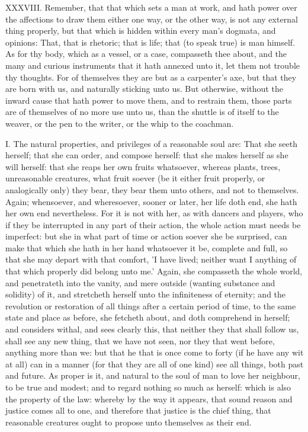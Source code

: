 XXXVIII. Remember, that that which sets a man at work, and hath power
over the affections to draw them either one way, or the other way, is not
any external thing properly, but that which is hidden within every man's
dogmata, and opinions: That, that is rhetoric; that is life; that (to
speak true) is man himself. As for thy body, which as a vessel, or a case,
compasseth thee about, and the many and curious instruments that it hath
annexed unto it, let them not trouble thy thoughts. For of themselves they
are but as a carpenter's axe, but that they are born with us, and
naturally sticking unto us. But otherwise, without the inward cause that
hath power to move them, and to restrain them, those parts are of
themselves of no more use unto us, than the shuttle is of itself to the
weaver, or the pen to the writer, or the whip to the coachman.


I. The natural properties, and privileges of a reasonable soul are: That
she seeth herself; that she can order, and compose herself: that she makes
herself as she will herself: that she reaps her own fruits whatsoever,
whereas plants, trees, unreasonable creatures, what fruit soever (be it
either fruit properly, or analogically only) they bear, they bear them
unto others, and not to themselves. Again; whensoever, and wheresoever,
sooner or later, her life doth end, she hath her own end nevertheless. For
it is not with her, as with dancers and players, who if they be
interrupted in any part of their action, the whole action must needs be
imperfect: but she in what part of time or action soever she be surprised,
can make that which she hath in her hand whatsoever it be, complete and
full, so that she may depart with that comfort, 'I have lived; neither
want I anything of that which properly did belong unto me.' Again, she
compasseth the whole world, and penetrateth into the vanity, and mere
outside (wanting substance and solidity) of it, and stretcheth herself
unto the infiniteness of eternity; and the revolution or restoration of
all things after a certain period of time, to the same state and place as
before, she fetcheth about, and doth comprehend in herself; and considers
withal, and sees clearly this, that neither they that shall follow us,
shall see any new thing, that we have not seen, nor they that went before,
anything more than we: but that he that is once come to forty (if he have
any wit at all) can in a manner (for that they are all of one kind) see
all things, both past and future. As proper is it, and natural to the soul
of man to love her neighbour, to be true and modest; and to regard nothing
so much as herself: which is also the property of the law: whereby by the
way it appears, that sound reason and justice comes all to one, and
therefore that justice is the chief thing, that reasonable creatures ought
to propose unto themselves as their end.

